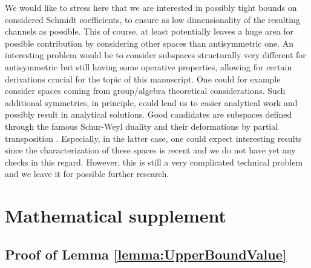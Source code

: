 \documentclass[reqno]{amsart}
\theoremstyle{plain}
\theoremstyle{note}
\begin{document}
We would like to stress here that we are interested in possibly tight bounds on considered Schmidt coefficients, to ensure as low dimensionality of the resulting channels as possible. This of course, at least potentially leaves a huge area for possible contribution by considering other spaces than antisymmetric one. An interesting problem would be to consider subspaces structurally very different for antisymmetric but still having some operative properties, allowing for certain derivations crucial for the topic of this manuscript. One could for example consider spaces coming from group/algebra theoretical considerations. Such additional symmetries, in principle, could lead us to easier analytical work and possibly result in analytical solutions. Good candidates are subspaces defined through the famous Schur-Weyl duality \cite{harrisBook,FultonSchur} and their deformations by partial transposition \cite{Mozrzymas_2018}. Especially, in the latter case, one could expect interesting results since the characterization of these spaces is recent and we do not have yet any checks in this regard. However, this is still a very complicated technical problem and we leave it for possible further research.

\appendix

\section{Mathematical supplement}
\label{app:Supplement}

\subsection{Proof of Lemma \ref{lemma:UpperBoundValue}}
\label{app:lemmaUpperBoundValueProof}
\end{document}
